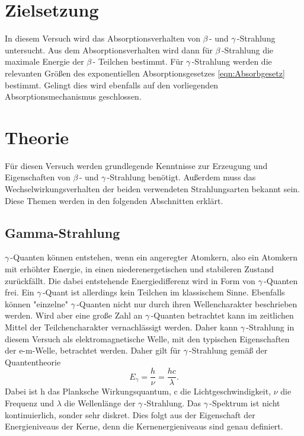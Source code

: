 \section{Zielsetzung}
\label{sec:Ziel}
In diesem Versuch wird das Absorptionsverhalten von $\beta$\,- und $\gamma$\,-Strahlung untersucht. Aus dem Absorptionsverhalten wird dann für $\beta$\,-Strahlung die 
maximale Energie der $\beta$\,- Teilchen bestimmt. Für $\gamma$\,-Strahlung werden die relevanten Größen des exponentiellen Absorptionsgesetzes \ref{eqn:Absorbgesetz} bestimmt.
Gelingt dies wird ebenfalls auf den vorliegenden Absorptionsmechanismus geschlossen.

\section{Theorie}
\label{sec:Theorie}
Für diesen Versuch werden grundlegende Kenntnisse zur Erzeugung und Eigenschaften von $\beta$\,- und $\gamma$\,-Strahlung benötigt. Außerdem muss das Wechselwirkungsverhalten der
beiden verwendeten Strahlungsarten bekannt sein. Diese Themen werden in den folgenden Abschnitten erklärt.

\subsection{Gamma-Strahlung}
\label{subec:Gammastrahlung}
$\gamma$\,-Quanten können entstehen, wenn ein angeregter Atomkern, also ein Atomkern mit erhöhter Energie, in einen niederenergetischen und stabileren Zustand zurückfällt. Die 
dabei entstehende Energiedifferenz wird in Form von $\gamma$\,-Quanten frei. Ein $\gamma$\,-Quant ist allerdings kein Teilchen im klassischem Sinne. Ebenfalls können "einzelne"
$\gamma$\,-Quanten nicht nur durch ihren Wellencharakter beschrieben werden. Wird aber eine große Zahl an $\gamma$\,-Quanten betrachtet kann im zeitlichen Mittel der 
Teilchencharakter vernachlässigt werden. Daher kann $\gamma$\,-Strahlung in diesem Versuch als elektromagnetische Welle, mit den typischen Eigenschaften der e-m-Welle,
betrachtet werden. Daher gilt für $\gamma$\,-Strahlung gemäß der Quantentheorie 
\begin{equation*}
    E_{\gamma} = \frac{h}{\nu} = \frac{hc}{\lambda}.
\end{equation*}
Dabei ist h das Planksche Wirkungsquantum, c die Lichtgeschwindigkeit, $\nu$ die Frequenz und $\lambda$ die Wellenlänge der $\gamma$\,-Strahlung. Das $\gamma$\,-Spektrum ist 
nicht kontinuierlich, sonder sehr diskret. Dies folgt aus der Eigenschaft der Energieniveaus der Kerne, denn die Kernenergieniveaus sind genau definiert.

